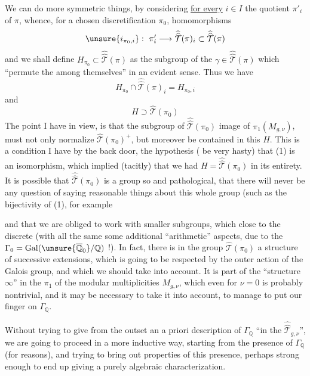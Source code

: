 We can do more symmetric things, by considering \uline{for every} $i\in I$ the  quotient $\pi'_i$ of $\pi$, whence, for a chosen discretification $\pi_0$, homomorphisms
\[
\unsure{i_{\pi_0,i}}:\ \pi'_i\longrightarrow
\widehat{\widehat{\mathcal T}}(\pi)_i\subset
\widehat{\widehat{\mathcal T}}(\pi)
\]
and we shall define $H_{\pi_0}\subset\widehat{\widehat{\mathcal T}}(\pi)$ as the subgroup of the $\gamma\in\widehat{\widehat{\mathcal T}}(\pi)$ which ``permute the  among themselves'' in an evident sense. Thus we have
\[
\tag{7}
H_{\pi_0}\cap\widehat{\widehat{\mathcal T}}(\pi)_i=H_{\pi_0,i}
\]
and
\[
\tag{8}
H\supset\widehat{\mathcal T}(\pi_0)
\]
The point I have in view, is that the subgroup of $\widehat{\widehat{\mathcal T}}(\pi_0)$ image of $\pi_1(M_{g,\nu})$, must not only normalize $\widehat{\mathcal T}(\pi_0)^+$, but moreover be contained in this $H$. This is a condition I have  by the back door,  the hypothesis ( be very hasty) that (1) is an isomorphism, which implied (tacitly) that we had $H=\widehat{\widehat{\mathcal T}}(\pi_0)$ in its entirety. It is possible that $\widehat{\widehat{\mathcal T}}(\pi_0)$ is a group so  and pathological, that there will never be any question of saying reasonable  things about  this whole group (such as the bijectivity of (1), for example



and that we are obliged to work with smaller subgroups, which  close to the discrete (with all the same some additional ``arithmetic'' aspects, due to the $\Gamma_0=\mathrm{Gal}(\unsure{\overline{\mathbb Q}_0}/\mathbb Q)$ !). In fact, there is  in the group $\widehat{\mathcal T}(\pi_0)$ a  structure of successive extensions, which is going to be respected by the outer action of the Galois group, and which we should take into account. It is part of the ``structure  $\infty$'' in the $\pi_1$ of the  modular multiplicities $M_{g,\nu}$, which even for $\nu=0$ is probably nontrivial, and it may be necessary to take it into account, to manage to put our finger on $\Gamma_{\mathbb Q}$.

Without trying to give from the outset an a priori description of $\Gamma_{\mathbb Q}$ ``in the $\widehat{\widehat{\mathcal T}}_{g,\nu}$'', we are going to proceed in a more inductive way, starting from the presence of $\Gamma_{\mathbb Q}$ (for  reasons), and trying to bring out properties of this presence, perhaps strong enough to end up giving a purely algebraic characterization.

